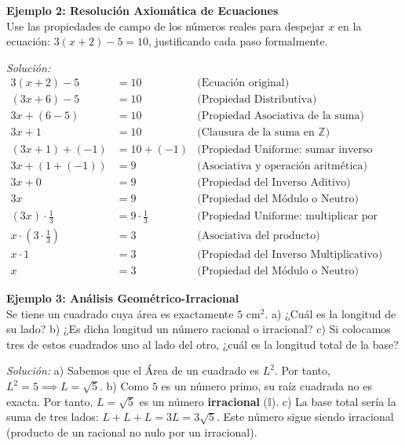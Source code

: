 \vspace{0.3cm}

\textbf{Ejemplo 2: Resolución Axiomática de Ecuaciones} \\
Use las propiedades de campo de los números reales para despejar $x$ en la ecuación: $3(x+2) - 5 = 10$, justificando cada paso formalmente.

\textit{Solución:}
\begin{align*}
    3(x+2) - 5 &= 10 & \text{(Ecuación original)} \\
    (3x + 6) - 5 &= 10 & \text{(Propiedad Distributiva)} \\
    3x + (6 - 5) &= 10 & \text{(Propiedad Asociativa de la suma)} \\
    3x + 1 &= 10 & \text{(Clausura de la suma en } \mathbb{Z}) \\
    (3x + 1) + (-1) &= 10 + (-1) & \text{(Propiedad Uniforme: sumar inverso aditivo)} \\
    3x + (1 + (-1)) &= 9 & \text{(Asociativa y operación aritmética)} \\
    3x + 0 &= 9 & \text{(Propiedad del Inverso Aditivo)} \\
    3x &= 9 & \text{(Propiedad del Módulo o Neutro)} \\
    (3x) \cdot \frac{1}{3} &= 9 \cdot \frac{1}{3} & \text{(Propiedad Uniforme: multiplicar por inverso)} \\
    x \cdot \left(3 \cdot \frac{1}{3}\right) &= 3 & \text{(Asociativa del producto)} \\
    x \cdot 1 &= 3 & \text{(Propiedad del Inverso Multiplicativo)} \\
    x &= 3 & \text{(Propiedad del Módulo o Neutro)}
\end{align*}

\vspace{0.3cm}

\textbf{Ejemplo 3: Análisis Geométrico-Irracional} \\
Se tiene un cuadrado cuya área es exactamente $5 \text{ cm}^2$.
a) ¿Cuál es la longitud de su lado?
b) ¿Es dicha longitud un número racional o irracional?
c) Si colocamos tres de estos cuadrados uno al lado del otro, ¿cuál es la longitud total de la base?

\textit{Solución:}
a) Sabemos que el Área de un cuadrado es $L^2$. Por tanto, $L^2 = 5 \implies L = \sqrt{5}$.
b) Como $5$ es un número primo, su raíz cuadrada no es exacta. Por tanto, $L = \sqrt{5}$ es un número \textbf{irracional} ($\mathbb{I}$).
c) La base total sería la suma de tres lados: $L + L + L = 3L = 3\sqrt{5}$. Este número sigue siendo irracional (producto de un racional no nulo por un irracional).

